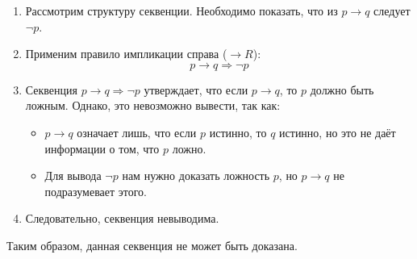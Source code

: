 \documentclass[12pt,a4paper]{article}
\begin{document}
\begin{enumerate}
    \item Рассмотрим структуру секвенции. Необходимо показать, что из $p \to q$ следует $\neg p$.
    \item Применим правило импликации справа ($\to R$):
    \[
    p \to q \Rightarrow \neg p
    \]
    \item Секвенция $p \to q \Rightarrow \neg p$ утверждает, что если $p \to q$, то $p$ должно быть ложным. Однако, это невозможно вывести, так как:
    \begin{itemize}
        \item $p \to q$ означает лишь, что если $p$ истинно, то $q$ истинно, но это не даёт информации о том, что $p$ ложно.
        \item Для вывода $\neg p$ нам нужно доказать ложность $p$, но $p \to q$ не подразумевает этого.
    \end{itemize}
    \item Следовательно, секвенция невыводима.
\end{enumerate}

Таким образом, данная секвенция не может быть доказана.
\end{document}
